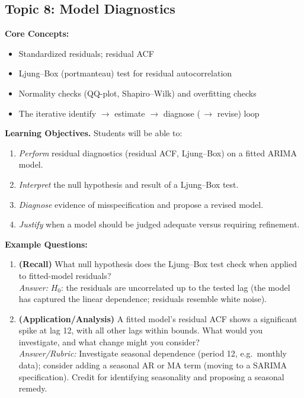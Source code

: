 \documentclass[11pt]{article}
\begin{document}
\subsection{Topic 8: Model Diagnostics}

\textbf{Core Concepts:}
\begin{itemize}
\item Standardized residuals; residual ACF
\item Ljung--Box (portmanteau) test for residual autocorrelation
\item Normality checks (QQ-plot, Shapiro--Wilk) and overfitting checks
\item The iterative identify $\to$ estimate $\to$ diagnose (\,$\to$ revise) loop
\end{itemize}

\textbf{Learning Objectives.} Students will be able to:
\begin{enumerate}
\item \emph{Perform} residual diagnostics (residual ACF, Ljung--Box) on a fitted ARIMA model.
\item \emph{Interpret} the null hypothesis and result of a Ljung--Box test.
\item \emph{Diagnose} evidence of misspecification and propose a revised model.
\item \emph{Justify} when a model should be judged adequate versus requiring refinement.
\end{enumerate}

\textbf{Example Questions:}
\begin{enumerate}
\item \textbf{(Recall)} What null hypothesis does the Ljung--Box test check when applied to fitted-model residuals? \\
\emph{Answer:} $H_0$: the residuals are uncorrelated up to the tested lag (the model has captured the linear dependence; residuals resemble white noise).
\item \textbf{(Application/Analysis)} A fitted model's residual ACF shows a significant spike at lag 12, with all other lags within bounds. What would you investigate, and what change might you consider? \\
\emph{Answer/Rubric:} Investigate seasonal dependence (period 12, e.g.\ monthly data); consider adding a seasonal AR or MA term (moving to a SARIMA specification). Credit for identifying seasonality and proposing a seasonal remedy.
\end{enumerate}
\end{document}
